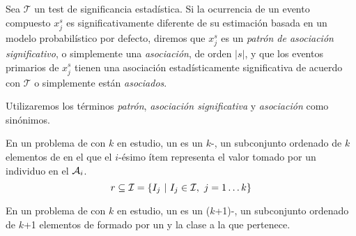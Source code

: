 \begin{Definition}
   Sea $\mathcal{T}$ un test de significancia estadística. Si la ocurrencia de un evento compuesto $x_j^s$ es significativamente diferente de su estimación basada en un modelo probabilístico por defecto, diremos que $x_j^s$ es un \emph{patrón de asociación significativo}, o simplemente una \emph{asociación}, de orden $|s|$, y que los eventos primarios de $x_j^s$ tienen una asociación estadísticamente significativa de acuerdo con $\mathcal{T}$ o simplemente están \emph{asociados}.
\label{def:patron-de-asociación-significativo}
\end{Definition}



Utilizaremos los términos \emph{patrón}, \emph{asociación significativa} y \emph{asociación} como sinónimos.




\clearpage












\begin{Definition}[\Registro]
   En un problema de \Clasificacion con $k$ \atributos en estudio, un \registro \reg es un $k$-\itemset, un subconjunto ordenado de $k$ elementos de \I en el que el $i$-ésimo ítem representa el valor tomado por un individuo en el \atributo $\A_i$.
   \begin{equation}\label{eq:def-registro}
     \reg \subseteq \I = \left\{I_j\ | \ I_j \in \I,\ j = 1 \ldots k\right\}
   \end{equation}
\label{def:registro}
\end{Definition}

\begin{Definition}[\RegClas]
   En un problema de \Clasificacion con $k$ \atributos en estudio, un \RegClas es un ($k$+1)-\itemset, un subconjunto ordenado de $k$+1 elementos de \I formado por un \registro y la clase a la que pertenece.
\label{def:registro-clasificado}
\end{Definition}

